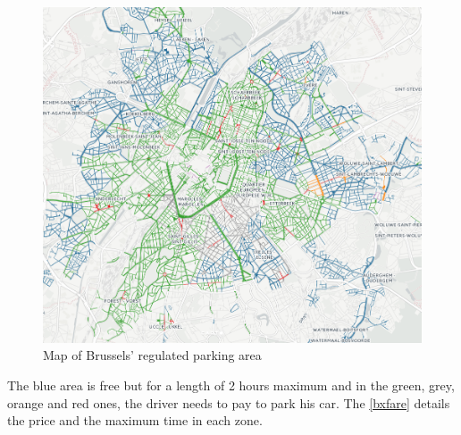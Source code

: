 \documentclass[12pt,a4paper,oneside]{book}
\begin{document}
\begin{figure}[h]
\centering
\caption{Map of Brussels' regulated parking area}
\label{bxmap}
\includegraphics[keepaspectratio=true,width=\textwidth-2cm]{../images/bxpark.png}
\end{figure}


The blue area is free but for a length of 2 hours maximum and in the green, grey, orange and red ones, the driver needs to pay to park his car. The \autoref{bxfare} details the price and the maximum time in each zone.\\
\end{document}
